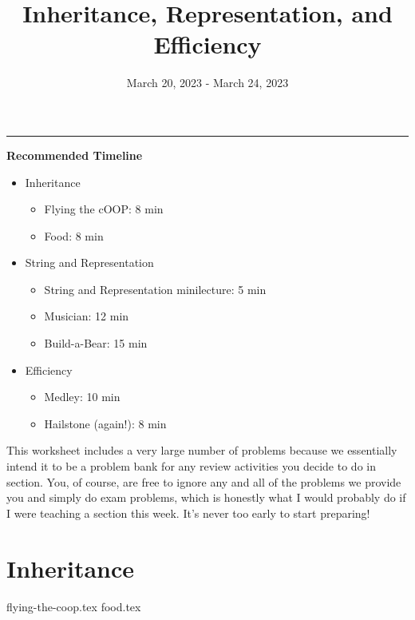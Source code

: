 \documentclass{exam}
\title{Inheritance, Representation, and Efficiency}
\date{March 20, 2023 - March 24, 2023}
\begin{document}
\maketitle
\rule{\textwidth}{0.15em}

\begin{meta}
    \textbf{Recommended Timeline}
    \begin{itemize}
        \item Inheritance
        \begin{itemize}
            \item Flying the cOOP: 8 min
            \item Food: 8 min
        \end{itemize}
        \item String and Representation
        \begin{itemize}
            \item String and Representation minilecture: 5 min
            \item Musician: 12 min
            \item Build-a-Bear: 15 min
        \end{itemize}
        \item Efficiency
        \begin{itemize}
            \item Medley: 10 min
            \item Hailstone (again!): 8 min
        \end{itemize}
    \end{itemize}
    This worksheet includes a very large number of problems because we essentially intend it to be a problem bank for any review activities you decide to do in section. You, of course, are free to ignore any and all of the problems we provide you and simply do exam problems, which is honestly what I would probably do if I were teaching a section this week. It's never too early to start preparing!
\end{meta}

\section{Inheritance}
\begin{questions}
    \newpage
    {flying-the-coop.tex}
    \newpage
    {food.tex}
\end{questions}
\end{document}
